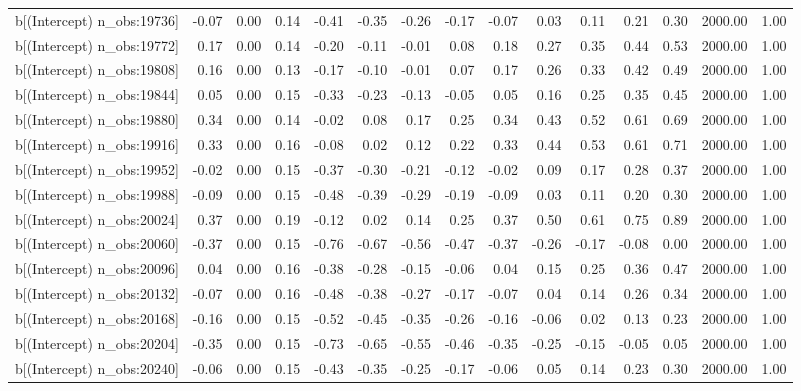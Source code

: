 \begin{table}[ht]
\begin{tabular}{rrrrrrrrrrrrrrr}
  b[(Intercept) n\_obs:19736] & -0.07 & 0.00 & 0.14 & -0.41 & -0.35 & -0.26 & -0.17 & -0.07 & 0.03 & 0.11 & 0.21 & 0.30 & 2000.00 & 1.00 \\ 
  b[(Intercept) n\_obs:19772] & 0.17 & 0.00 & 0.14 & -0.20 & -0.11 & -0.01 & 0.08 & 0.18 & 0.27 & 0.35 & 0.44 & 0.53 & 2000.00 & 1.00 \\ 
  b[(Intercept) n\_obs:19808] & 0.16 & 0.00 & 0.13 & -0.17 & -0.10 & -0.01 & 0.07 & 0.17 & 0.26 & 0.33 & 0.42 & 0.49 & 2000.00 & 1.00 \\ 
  b[(Intercept) n\_obs:19844] & 0.05 & 0.00 & 0.15 & -0.33 & -0.23 & -0.13 & -0.05 & 0.05 & 0.16 & 0.25 & 0.35 & 0.45 & 2000.00 & 1.00 \\ 
  b[(Intercept) n\_obs:19880] & 0.34 & 0.00 & 0.14 & -0.02 & 0.08 & 0.17 & 0.25 & 0.34 & 0.43 & 0.52 & 0.61 & 0.69 & 2000.00 & 1.00 \\ 
  b[(Intercept) n\_obs:19916] & 0.33 & 0.00 & 0.16 & -0.08 & 0.02 & 0.12 & 0.22 & 0.33 & 0.44 & 0.53 & 0.61 & 0.71 & 2000.00 & 1.00 \\ 
  b[(Intercept) n\_obs:19952] & -0.02 & 0.00 & 0.15 & -0.37 & -0.30 & -0.21 & -0.12 & -0.02 & 0.09 & 0.17 & 0.28 & 0.37 & 2000.00 & 1.00 \\ 
  b[(Intercept) n\_obs:19988] & -0.09 & 0.00 & 0.15 & -0.48 & -0.39 & -0.29 & -0.19 & -0.09 & 0.03 & 0.11 & 0.20 & 0.30 & 2000.00 & 1.00 \\ 
  b[(Intercept) n\_obs:20024] & 0.37 & 0.00 & 0.19 & -0.12 & 0.02 & 0.14 & 0.25 & 0.37 & 0.50 & 0.61 & 0.75 & 0.89 & 2000.00 & 1.00 \\ 
  b[(Intercept) n\_obs:20060] & -0.37 & 0.00 & 0.15 & -0.76 & -0.67 & -0.56 & -0.47 & -0.37 & -0.26 & -0.17 & -0.08 & 0.00 & 2000.00 & 1.00 \\ 
  b[(Intercept) n\_obs:20096] & 0.04 & 0.00 & 0.16 & -0.38 & -0.28 & -0.15 & -0.06 & 0.04 & 0.15 & 0.25 & 0.36 & 0.47 & 2000.00 & 1.00 \\ 
  b[(Intercept) n\_obs:20132] & -0.07 & 0.00 & 0.16 & -0.48 & -0.38 & -0.27 & -0.17 & -0.07 & 0.04 & 0.14 & 0.26 & 0.34 & 2000.00 & 1.00 \\ 
  b[(Intercept) n\_obs:20168] & -0.16 & 0.00 & 0.15 & -0.52 & -0.45 & -0.35 & -0.26 & -0.16 & -0.06 & 0.02 & 0.13 & 0.23 & 2000.00 & 1.00 \\ 
  b[(Intercept) n\_obs:20204] & -0.35 & 0.00 & 0.15 & -0.73 & -0.65 & -0.55 & -0.46 & -0.35 & -0.25 & -0.15 & -0.05 & 0.05 & 2000.00 & 1.00 \\ 
  b[(Intercept) n\_obs:20240] & -0.06 & 0.00 & 0.15 & -0.43 & -0.35 & -0.25 & -0.17 & -0.06 & 0.05 & 0.14 & 0.23 & 0.30 & 2000.00 & 1.00 \\ 

\end{tabular}
\end{table}
